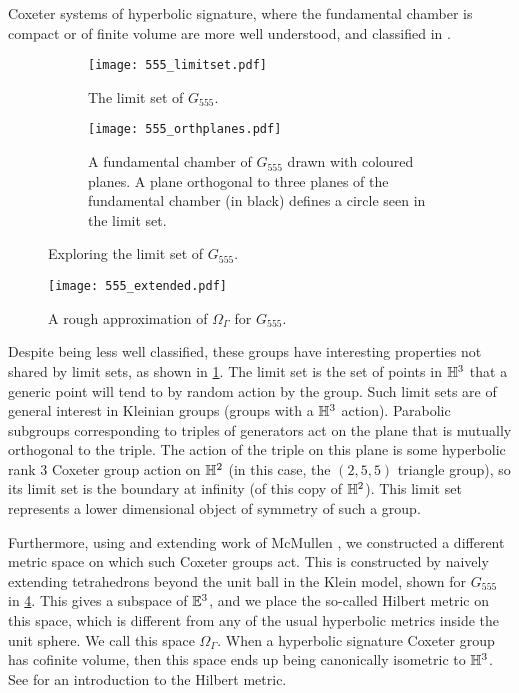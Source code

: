 Coxeter systems of hyperbolic signature, where the fundamental chamber is compact or of finite volume are more well understood, and classified in \cite[Section 6.9]{humphreys_reflection_1990}.

\begin{figure}[ht]
	\centering
	\begin{subfigure}[t]{.45\textwidth}
		\centering
		\texttt{[image: 555\_limitset.pdf]}
		\caption{The limit set of $G_{555}$.}
		\label{fig:555_limitset}
	\end{subfigure}
	\hspace{0.2ex}
	\begin{subfigure}[t]{.45\textwidth}
		\centering
		\texttt{[image: 555\_orthplanes.pdf]}
		\caption{A fundamental chamber of $G_{555}$ drawn with coloured planes.
			A plane orthogonal to three planes of the fundamental chamber (in black) defines a circle seen in the limit set.}
		\label{fig:555_orthogonal_planes}
	\end{subfigure}%
	\caption{Exploring the limit set of $G_{555}$.}
\end{figure}

\begin{figure}[ht]
	\centering
	\texttt{[image: 555\_extended.pdf]}
	\caption{A rough approximation of $\Omega_\Gamma$ for $G_{555}$.}
	\label{fig:555_exteded_space}
\end{figure}


Despite being less well classified, these groups have interesting properties not shared by limit sets, as shown in \cref{fig:555_limitset}.
The limit set is the set of points in $\mathbb{H}^3$ that a generic point will tend to by random action by the group.
Such limit sets are of general interest in Kleinian groups (groups with a $\mathbb{H}^3$ action).
Parabolic subgroups corresponding to triples of generators act on the plane that is mutually orthogonal to the triple.
The action of the triple on this plane is some hyperbolic rank 3 Coxeter group action on $\mathbb{H}^2$ (in this case, the $(2,5,5)$ triangle group), so its limit set is the boundary at infinity (of this copy of $\mathbb{H}^2$).
This limit set represents a lower dimensional object of symmetry of such a group.

Furthermore, using and extending work of McMullen \cite{mcmullen_coxeter_2002}, we constructed a different metric space on which such Coxeter groups act.
This is constructed by naively extending tetrahedrons beyond the unit ball in the Klein model, shown for $G_{555}$ in \cref{fig:555_exteded_space}.
This gives a subspace of $\mathbb{E}^3$, and we place the so-called Hilbert metric on this space, which is different from any of the usual hyperbolic metrics inside the unit sphere.
We call this space $\Omega_\Gamma$.
When a hyperbolic signature Coxeter group has cofinite volume, then this space ends up being canonically isometric to  $\mathbb{H}^3$.
See \cite{papadopoulos_troyanov_handbook_2014} for an introduction to the Hilbert metric.

